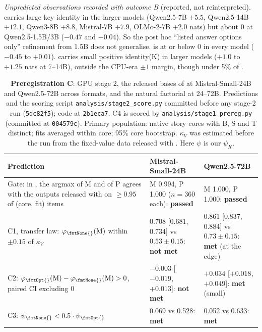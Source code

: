 \begin{table}[!ht]
\begin{minipage}{0.94\textwidth}
\emph{Unpredicted observations recorded with outcome B} (reported, not reinterpreted). \fmtPost{} carries large key identity in the larger models (Qwen2.5-7B $+5.5$, Qwen2.5-14B $+12.1$, Qwen3-8B $+8.8$, Mistral-7B $+7.9$, OLMo-2-7B $+2.0$ nats) but about 0 at Qwen2.5-1.5B/3B ($-0.47$ and $-0.04$). So the post hoc ``listed answer options only'' refinement from 1.5B does not generalise. \fmtBefore{} is at or below 0 in every model ($-0.45$ to $+0.01$). \fmtNone{} carries small positive identity(K) in larger models ($+1.0$ to $+1.25$ nats at 7--14B), outside the CPU-era $\pm 1$ margin, though under 5\% of \fmtOpt{}.
\end{minipage}
\end{table}

\begin{table}[!ht]
\centering
\footnotesize
\caption{\textbf{Preregistration C}: GPU stage 2, the released bases of \citet{anonymous2026fitted} at Mistral-Small-24B and Qwen2.5-72B across formats, and the natural factorial at 24--72B. Predictions and the scoring script \texttt{analysis/stage2\_score.py} committed before any stage-2 run (\texttt{5dc82f5}); code at \texttt{2b1eca7}. C4 is scored by \texttt{analysis/stage1\_prereg.py} (committed at \texttt{004579c}). Primary population: native story cores with B, S and T distinct; fits averaged within core; 95\% core bootstrap. $\kappa_V$ was estimated before the run from the fixed-value data released with \citet{anonymous2026fitted}. Here $\psi$ is our $\psi_K$.}
\label{tab:prereg-c}
\begin{tabular}{p{}p{}p{}}
\toprule
Prediction & Mistral-Small-24B & Qwen2.5-72B \\
\midrule
Gate: in \fmtOpt{}, the argmax of M and of P agrees with the outputs released with \citet{anonymous2026fitted} on $\geq 0.95$ of (core, fit) items & M 0.994, P 1.000 ($n = 360$ each): \textbf{passed} & M 1.000, P 1.000: \textbf{passed} \\
C1, transfer law: $\varphi_{\text{\fmtNone{}}}(\text{M})$ within $\pm 0.15$ of $\kappa_V$ & 0.708 [0.681, 0.734] vs $0.53 \pm 0.15$: \textbf{not met} & 0.861 [0.837, 0.884] vs $0.73 \pm 0.15$: \textbf{met} (at the edge) \\
C2: $\varphi_{\text{\fmtOpt{}}}(\text{M}) - \varphi_{\text{\fmtNone{}}}(\text{M}) > 0$, paired CI excluding 0 & $-0.003$ [$-0.019$, $+0.013$]: \textbf{not met} & $+0.034$ [$+0.018$, $+0.049$]: \textbf{met} (small) \\
C3: $\psi_{\text{\fmtNone{}}} < 0.5 \cdot \psi_{\text{\fmtOpt{}}}$ & 0.069 vs 0.528: \textbf{met} & 0.052 vs 0.633: \textbf{met} \\
\bottomrule
\end{tabular}


\end{table}
